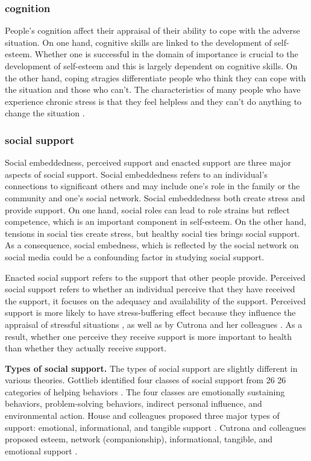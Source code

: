 \subsubsection{cognition}
People's cognition affect their appraisal of their ability to cope with the adverse situation. On one hand, cognitive skills are linked to the development of self-esteem. Whether one is successful in the domain of importance is crucial to the development of self-esteem and this is largely dependent on cognitive skills. On the other hand, coping stragies differentiate people who think they can cope with the situation and those who can't. The characteristics of many people who have experience chronic stress is that they feel helpless and they can't do anything to change the situation \cite{rutter1985resilience}. 


\subsubsection{social support}

Social embeddedness, perceived support and enacted support are three major aspects of social support. Social embeddedness refers to an individual's connections to significant others and may include one's role in the family or the community and one's social network. Social embeddedness both create stress and provide support. On one hand, social roles can lead to role strains but reflect competence, which is an important component in self-esteem. On the other hand, tensions in social ties create stress, but healthy social ties brings social support. As a consequence, social embedness, which is reflected by the social network on social media could be a confounding factor in studying social support. 

Enacted social support refers to the support that other people provide. Perceived social support refers to whether an individual perceive that they have received the support, it focuses on the adequacy and availability of the support.  Perceived support is more likely to have stress-buffering effect because they influence the appraisal of stressful situations \cite{cohen1984social}, as well as by Cutrona and her colleagues \cite{cutrona1990type}. As a result, whether one perceive they receive support is more important to health than whether they actually receive support. 


\textbf{Types of social support.} The types of social support are slightly different in various theories. Gottlieb identified four classes of social support from 26  26 categories of helping behaviors \cite{gottlieb1978development}. The four classes are emotionally sustaining behaviors, problem-solving behaviors, indirect personal influence, and environmental action. House and colleagues proposed three major types of support: emotional, informational, and tangible support \cite{house1985social}. Cutrona and colleagues proposed esteem, network (companionship), informational, tangible, and emotional support \cite{cutrona1990interpersonal}.


